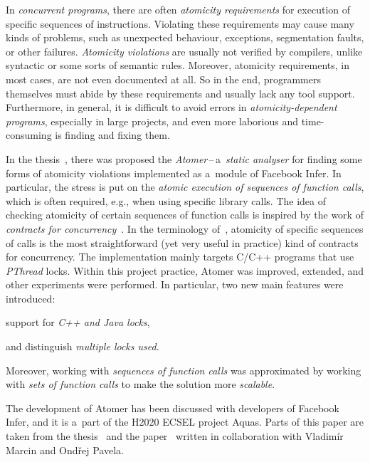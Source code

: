 In \emph{concurrent programs}, there are often \emph{atomicity requirements}
for execution of specific sequences of instructions. Violating these
requirements may cause many kinds of problems, such as unexpected behaviour,
exceptions, segmentation faults, or other failures. \emph{Atomicity violations}
are usually not verified by compilers, unlike syntactic or some sorts of
semantic rules. Moreover, atomicity requirements, in most cases, are not
even documented at all. So in the end, programmers themselves must abide by
these requirements and usually lack any tool support. Furthermore, in general,
it is difficult to avoid errors in \emph{atomicity-dependent programs},
especially in large projects, and even more laborious and time-consuming is
finding and fixing them.

In the thesis~\cite{harmimBP}, there was proposed the
\emph{Atomer}\,--\,a~\emph{static analyser} for finding some forms of
atomicity violations implemented as a~module of Facebook Infer. In particular,
the stress is put on the \emph{atomic execution of sequences of function
calls}, which is often required, e.g., when using specific library calls.
The idea of checking atomicity of certain sequences of function calls is
inspired by the work of \emph{contracts for
concurrency}~\cite{contracts2017}. In the terminology of~\cite{contracts2017},
atomicity of specific sequences of calls is the most straightforward (yet
very useful in practice) kind of contracts for concurrency. The implementation
mainly targets C/C++ programs that use \emph{PThread} locks. Within this
project practice, Atomer was improved, extended, and other experiments were
performed. In particular, two new main features were introduced:
\begin{enumerate*}[label={(\roman*)}]
    \item
        support for \emph{C++ and Java locks},

    \item
        and distinguish \emph{multiple locks used}.
\end{enumerate*}
Moreover, working with \emph{sequences of function calls} was approximated
by working with \emph{sets of function calls} to make the solution more
\emph{scalable}.

The development of Atomer has been discussed with developers of Facebook
Infer, and it is a~part of the H2020 ECSEL project Aquas. Parts of this
paper are taken from the thesis~\cite{harmimBP} and the
paper~\cite{excel2019FBInfer} written in collaboration with Vladimír Marcin
and Ondřej Pavela.

